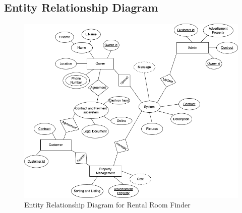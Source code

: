 \subsection{Entity Relationship Diagram}
\begin{figure}[hbt!]
    \centering
     \includegraphics[width=150mm]{EnityRelationship.png}
    \caption{Entity Relationship Diagram for Rental Room Finder }
    \label{fig:Entity Relationship Diagram}
\end{figure}
